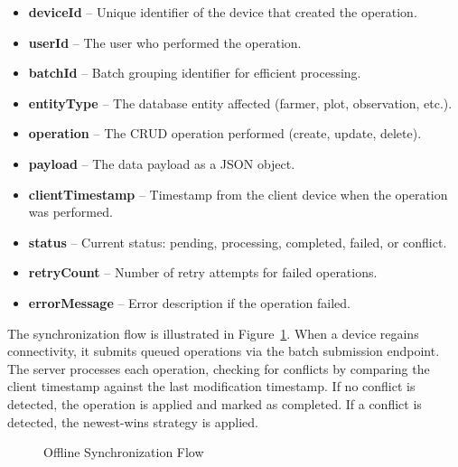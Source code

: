 \documentclass[12pt,a4paper,oneside]{report}
\begin{document}
\begin{itemize}
  \item \textbf{deviceId} -- Unique identifier of the device that created the operation.
  \item \textbf{userId} -- The user who performed the operation.
  \item \textbf{batchId} -- Batch grouping identifier for efficient processing.
  \item \textbf{entityType} -- The database entity affected (farmer, plot, observation, etc.).
  \item \textbf{operation} -- The CRUD operation performed (create, update, delete).
  \item \textbf{payload} -- The data payload as a JSON object.
  \item \textbf{clientTimestamp} -- Timestamp from the client device when the operation was performed.
  \item \textbf{status} -- Current status: pending, processing, completed, failed, or conflict.
  \item \textbf{retryCount} -- Number of retry attempts for failed operations.
  \item \textbf{errorMessage} -- Error description if the operation failed.
\end{itemize}

The synchronization flow is illustrated in Figure~\ref{fig:sync-flow}. When a device regains connectivity, it submits queued operations via the batch submission endpoint. The server processes each operation, checking for conflicts by comparing the client timestamp against the last modification timestamp. If no conflict is detected, the operation is applied and marked as completed. If a conflict is detected, the newest-wins strategy is applied.

\begin{figure}[H]
\centering
{}
\caption{Offline Synchronization Flow}
\label{fig:sync-flow}
\end{figure}
\end{document}
